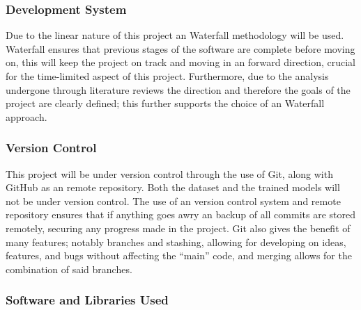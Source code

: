 \documentclass[12pt]{article}
\begin{document}
\subsubsection{Development System}

Due to the linear nature of this project an Waterfall methodology will be used. Waterfall ensures that previous stages of the software are complete before moving on, this will keep the project on track and moving in an forward direction, crucial for the time-limited aspect of this project. Furthermore, due to the analysis undergone through literature reviews the direction and therefore the goals of the project are clearly defined; this further supports the choice of an Waterfall approach.  

\subsubsection{Version Control}

This project will be under version control through the use of Git, along with GitHub as an remote repository. Both the dataset and the trained models will not be under version control. The use of an version control system and remote repository ensures that if anything goes awry an backup of all commits are stored remotely, securing any progress made in the project. Git also gives the benefit of many features; notably branches and stashing, allowing for developing on ideas, features, and bugs without affecting the ``main'' code, and merging allows for the combination of said branches. 

\subsubsection{Software and Libraries Used}
\end{document}
